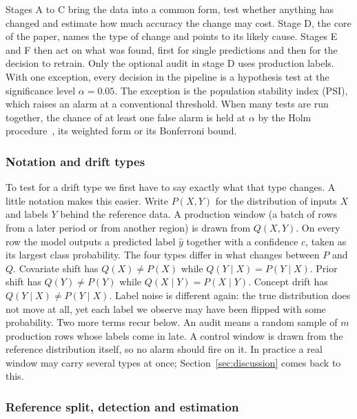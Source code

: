 \documentclass[pdflatex,referee,lineno,sn-basic]{sn-jnl}
\begin{document}
Stages A to C bring the data into a common form, test whether anything has changed and estimate how much accuracy the change may cost. Stage D, the core of the paper, names the type of change and points to its likely cause. Stages E and F then act on what was found, first for single predictions and then for the decision to retrain. Only the optional audit in stage D uses production labels. With one exception, every decision in the pipeline is a hypothesis test at the significance level $\alpha=0.05$. The exception is the population stability index (PSI), which raises an alarm at a conventional threshold. When many tests are run together, the chance of at least one false alarm is held at $\alpha$ by the Holm procedure~\citep{holm1979}, its weighted form or its Bonferroni bound.

\subsubsection{Notation and drift types}\label{sec:types}

To test for a drift type we first have to say exactly what that type changes. A little notation makes this easier. Write $P(X,Y)$ for the distribution of inputs $X$ and labels $Y$ behind the reference data. A production window (a batch of rows from a later period or from another region) is drawn from $Q(X,Y)$. On every row the model outputs a predicted label $\hat y$ together with a confidence $c$, taken as its largest class probability. The four types differ in what changes between $P$ and $Q$. Covariate shift has $Q(X)\neq P(X)$ while $Q(Y\mid X)=P(Y\mid X)$. Prior shift has $Q(Y)\neq P(Y)$ while $Q(X\mid Y)=P(X\mid Y)$. Concept drift has $Q(Y\mid X)\neq P(Y\mid X)$. Label noise is different again: the true distribution does not move at all, yet each label we observe may have been flipped with some probability. Two more terms recur below. An audit means a random sample of $m$ production rows whose labels come in late. A control window is drawn from the reference distribution itself, so no alarm should fire on it. In practice a real window may carry several types at once; Section~\ref{sec:discussion} comes back to this.

\subsubsection{Reference split, detection and estimation}\label{sec:detection}
\end{document}
